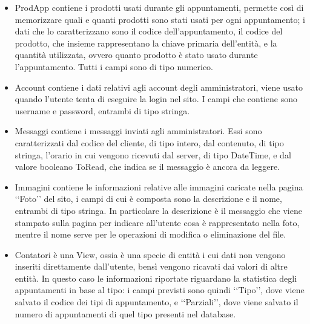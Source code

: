 {{\begin{itemize}
		\item ProdApp contiene i prodotti usati durante gli appuntamenti, permette così di memorizzare quali e quanti prodotti sono stati usati per ogni appuntamento; i dati che lo caratterizzano sono il codice dell'appuntamento, il codice del prodotto, che insieme rappresentano la chiave primaria dell'entità, e la quantità utilizzata, ovvero quanto prodotto è stato usato durante l'appuntamento. Tutti i campi sono di tipo numerico.
		\item Account contiene i dati relativi agli account degli amministratori, viene usato quando l'utente tenta di eseguire la login nel sito. I campi che contiene sono username e password, entrambi di tipo stringa.
		\item Messaggi contiene i messaggi inviati agli amministratori. Essi sono caratterizzati dal codice del cliente, di tipo intero, dal contenuto, di tipo stringa, l'orario in cui vengono ricevuti dal server, di tipo DateTime, e dal valore booleano ToRead, che indica se il messaggio è ancora da leggere.
		\item Immagini contiene le informazioni relative alle immagini caricate nella pagina ‘‘Foto’’ del sito, i campi di cui è composta sono la descrizione e il nome, entrambi di tipo stringa. In particolare la descrizione è il messaggio che viene stampato sulla pagina per indicare all'utente cosa è rappresentato nella foto, mentre il nome serve per le operazioni di modifica o eliminazione del file.
		\item Contatori è una View, ossia è una specie di entità i cui dati non vengono inseriti direttamente dall'utente, bensì vengono ricavati dai valori di altre entità. In questo caso le informazioni riportate riguardano la statistica degli appuntamenti in base al tipo: i campi previsti sono quindi ‘‘Tipo’’, dove viene salvato il codice dei tipi di appuntamento, e ‘‘Parziali’’, dove viene salvato il numero di appuntamenti di quel tipo presenti nel database.
		\end{itemize}
	}
}